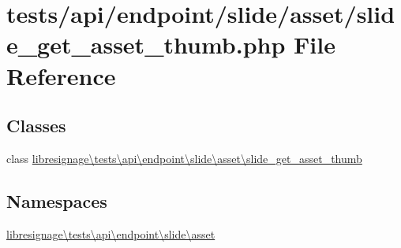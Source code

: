 \hypertarget{tests_2api_2endpoint_2slide_2asset_2slide__get__asset__thumb_8php}{}\section{tests/api/endpoint/slide/asset/slide\+\_\+get\+\_\+asset\+\_\+thumb.php File Reference}
\label{tests_2api_2endpoint_2slide_2asset_2slide__get__asset__thumb_8php}
\subsection*{Classes}
\begin{DoxyCompactItemize}
\item 
class \hyperlink{classlibresignage_1_1tests_1_1api_1_1endpoint_1_1slide_1_1asset_1_1slide__get__asset__thumb}{libresignage\textbackslash{}tests\textbackslash{}api\textbackslash{}endpoint\textbackslash{}slide\textbackslash{}asset\textbackslash{}slide\+\_\+get\+\_\+asset\+\_\+thumb}
\end{DoxyCompactItemize}
\subsection*{Namespaces}
\begin{DoxyCompactItemize}
\item 
 \hyperlink{namespacelibresignage_1_1tests_1_1api_1_1endpoint_1_1slide_1_1asset}{libresignage\textbackslash{}tests\textbackslash{}api\textbackslash{}endpoint\textbackslash{}slide\textbackslash{}asset}
\end{DoxyCompactItemize}
